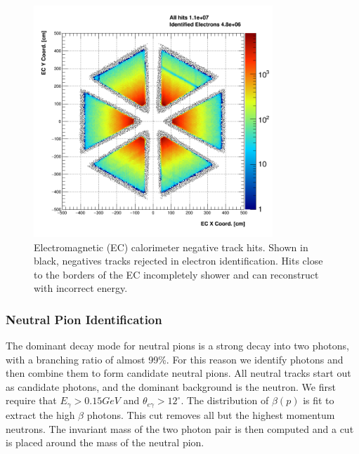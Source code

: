 \begin{figure}
  \centering
  \includegraphics[width=9cm]{image/ECFiducial.png}
  \caption{Electromagnetic (EC) calorimeter negative track hits.  Shown in black, negatives tracks rejected in electron identification.  Hits close to the borders of the EC incompletely shower and can reconstruct with incorrect energy.}
  \label{fig:ecfid}
\end{figure}

\subsubsection{Neutral Pion Identification}
The dominant decay mode for neutral pions is a strong decay into two photons, with a branching ratio of almost 99\%.  For this reason we identify photons and then combine them to form candidate neutral pions.  All neutral tracks start out as candidate photons, and the dominant background is the neutron. We first require that $E_{\gamma} > 0.15 GeV$ and $\theta_{e\gamma} > 12^{\circ}$. The distribution of $\beta(p)$ is fit to extract the high $\beta$ photons. This cut removes all but the highest momentum neutrons.  The invariant mass of the two photon pair is then computed and a cut is placed around the mass of the neutral pion.  

